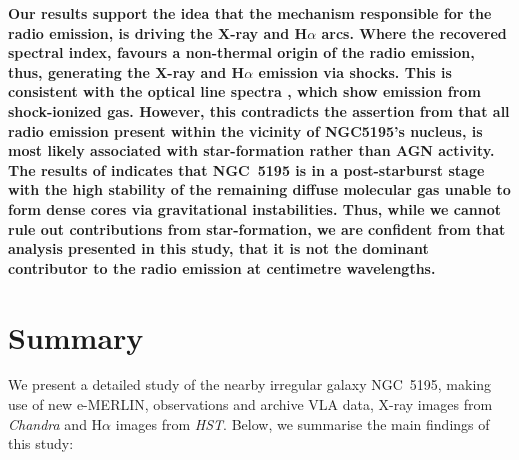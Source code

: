\documentclass[fleqn,usenatbib]{mnras}
\begin{document}
\textbf{Our results support the idea that the mechanism responsible for the radio emission, is driving 
the X-ray and H$\alpha$ arcs. Where the recovered spectral index, favours a non-thermal origin of the 
radio emission, thus, generating the X-ray and H$\alpha$ emission via shocks. This is consistent with 
the optical line spectra \citep{Hoopes-Walterbos}, which show emission from shock-ionized gas. 
However, this contradicts the assertion from \cite{Alataloetal2016} that all radio emission present 
within the vicinity of NGC5195's nucleus, is most likely associated with star-formation rather than AGN 
activity. The results of \cite{Kohnoetal2002} indicates that NGC~5195 is in a post-starburst stage with 
the high stability of the remaining diffuse molecular gas unable to form dense cores via gravitational 
instabilities. Thus, while we cannot rule out contributions from star-formation, we are confident from 
that analysis presented in this study, that it is not the dominant contributor to the radio emission at 
centimetre wavelengths.} 



\section{Summary}

We present a detailed study of the nearby irregular galaxy NGC~5195, making use of new e-MERLIN, 
observations and archive VLA data, X-ray images from \textit{Chandra} and H$\alpha$ images from 
\textit{HST}. Below, we summarise the main findings of this study:
\end{document}
